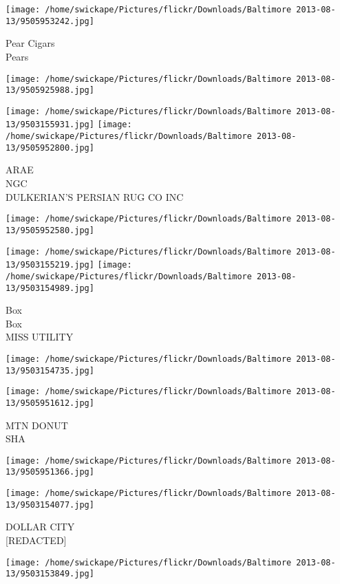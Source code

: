 \documentclass[10pt,letterpaper]{article}
\begin{document}
\vspace{0.25in}
\texttt{[image: /home/swickape/Pictures/flickr/Downloads/Baltimore 2013-08-13/9505953242.jpg]}

Pear Cigars\\
Pears
\pagebreak

\texttt{[image: /home/swickape/Pictures/flickr/Downloads/Baltimore 2013-08-13/9505925988.jpg]}

\vspace{0.25in}
\texttt{[image: /home/swickape/Pictures/flickr/Downloads/Baltimore 2013-08-13/9503155931.jpg]}
\texttt{[image: /home/swickape/Pictures/flickr/Downloads/Baltimore 2013-08-13/9505952800.jpg]}

ARAE\\
NGC\\
DULKERIAN'S PERSIAN RUG CO INC
\pagebreak

\texttt{[image: /home/swickape/Pictures/flickr/Downloads/Baltimore 2013-08-13/9505952580.jpg]}

\vspace{0.25in}
\texttt{[image: /home/swickape/Pictures/flickr/Downloads/Baltimore 2013-08-13/9503155219.jpg]}
\texttt{[image: /home/swickape/Pictures/flickr/Downloads/Baltimore 2013-08-13/9503154989.jpg]}

Box\\
Box\\
MISS UTILITY
\pagebreak

\texttt{[image: /home/swickape/Pictures/flickr/Downloads/Baltimore 2013-08-13/9503154735.jpg]}

\vspace{0.25in}
\texttt{[image: /home/swickape/Pictures/flickr/Downloads/Baltimore 2013-08-13/9505951612.jpg]}

MTN DONUT\\
SHA
\pagebreak

\texttt{[image: /home/swickape/Pictures/flickr/Downloads/Baltimore 2013-08-13/9505951366.jpg]}

\vspace{0.25in}
\texttt{[image: /home/swickape/Pictures/flickr/Downloads/Baltimore 2013-08-13/9503154077.jpg]}

DOLLAR CITY\\
{[}REDACTED{]}
\pagebreak

\texttt{[image: /home/swickape/Pictures/flickr/Downloads/Baltimore 2013-08-13/9503153849.jpg]}
\end{document}

